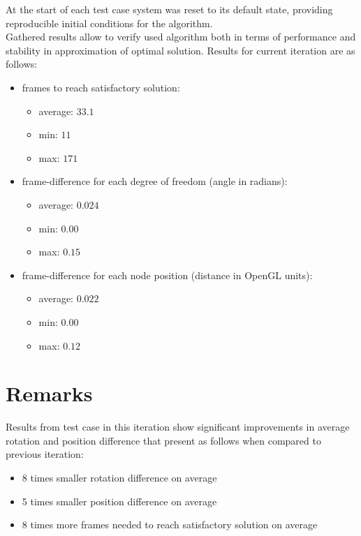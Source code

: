 \documentclass[]{report}
\begin{document}
\noindent At the start of each test case system was reset to its default state, providing reproducible initial conditions for the algorithm.\\

\noindent Gathered results allow to verify used algorithm both in terms of performance and 
stability in approximation of optimal solution. Results for current iteration are as follows:

\begin{itemize}
	\item frames to reach satisfactory solution: 
	\begin{itemize}
		\item average: $33.1$ 
		\item min: $11$
		\item max: $171$
	\end{itemize}
	\item frame-difference for each degree of freedom (angle in radians): 
	\begin{itemize}
		\item average: $0.024$
		\item min: $0.00$
		\item max: $0.15$
	\end{itemize}
	\item frame-difference for each node position (distance in OpenGL units):
	\begin{itemize}
		\item  average: $0.022$ 
		\item min: $0.00$ 
		\item max: $0.12$
	\end{itemize}
\end{itemize}


\chapter*{Remarks}
\noindent Results from test case in this iteration show significant improvements in average rotation and position difference that present as follows when compared to previous iteration:
\begin{itemize}
	\item 8 times smaller rotation difference on average
	\item 5 times smaller position difference on average
	\item 8 times more frames needed to reach satisfactory solution on average
\end{itemize}
\end{document}
